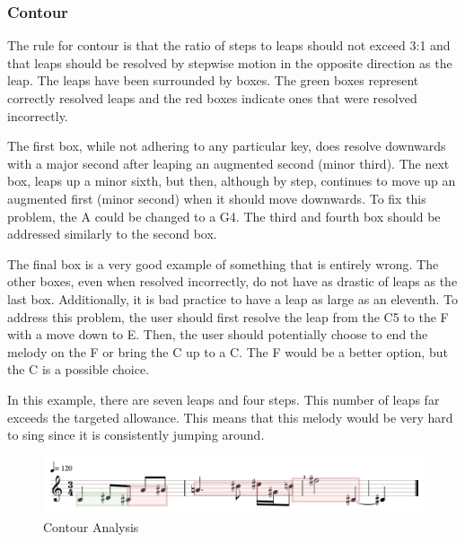 \subsubsection{Contour}
\label{subsubsec:contour}

The rule for contour is that the ratio of steps to leaps should not exceed 3:1 and that leaps should be resolved by stepwise motion in the opposite direction as the leap.  The leaps have been surrounded by boxes.  The green boxes represent correctly resolved leaps and the red boxes indicate ones that were resolved incorrectly.

\vspace{\baselineskip}

The first box, while not adhering to any particular key, does resolve downwards with a major second after leaping an augmented second (minor third).  The next box, leaps up a minor sixth, but then, although by step, continues to move up an augmented first (minor second) when it should move downwards.  To fix this problem, the A could be changed to a G4.  The third and fourth box should be addressed similarly to the second box.

\vspace{\baselineskip}

The final box is a very good example of something that is entirely wrong.  The other boxes, even when resolved incorrectly, do not have as drastic of leaps as the last box.  Additionally, it is bad practice to have a leap as large as an eleventh.  To address this problem, the user should first resolve the leap from the C5 to the F with a move down to E.  Then, the user should potentially choose to end the melody on the F or bring the C up to a C.  The F would be a better option, but the C is a possible choice.

\vspace{\baselineskip}

In this example, there are seven leaps and four steps.  This number of leaps far exceeds the targeted allowance.  This means that this melody would be very hard to sing since it is consistently jumping around.

\begin{figure}[!htbp]
	\centering
	\caption{Contour Analysis}
	\includegraphics[scale=0.4]{images/contour.png}
\end{figure}

